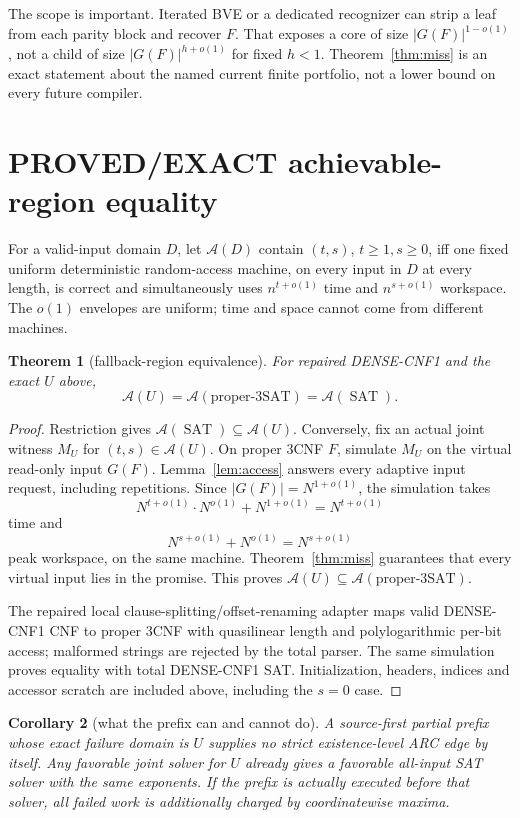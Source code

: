 \documentclass[11pt]{article}
\newtheorem{theorem}{Theorem}
\newtheorem{corollary}[theorem]{Corollary}
\newcommand{\SAT}{\operatorname{SAT}}
\newcommand{\A}{\mathcal A}
\begin{document}
The scope is important.  Iterated BVE or a dedicated recognizer can strip a
leaf from each parity block and recover $F$.  That exposes a core of size
$|G(F)|^{1-o(1)}$, not a child of size $|G(F)|^{h+o(1)}$ for fixed $h<1$.
Theorem~\ref{thm:miss} is an exact statement about the named current finite
portfolio, not a lower bound on every future compiler.

\section{PROVED/EXACT achievable-region equality}

For a valid-input domain $D$, let $\A(D)$ contain $(t,s)$, $t\ge1,s\ge0$,
iff one fixed uniform deterministic random-access machine, on every input in
$D$ at every length, is correct and simultaneously uses
$n^{t+o(1)}$ time and $n^{s+o(1)}$ workspace.  The $o(1)$ envelopes are
uniform; time and space cannot come from different machines.

\begin{theorem}[fallback-region equivalence]\label{thm:region}
For repaired DENSE-CNF1 and the exact $U$ above,
\[
 \boxed{\A(U)=\A(\mathrm{proper\mbox{-}3SAT})=\A(\SAT).}  \tag{7}
\]
\end{theorem}
\begin{proof}
Restriction gives $\A(\SAT)\subseteq\A(U)$.  Conversely, fix an actual
joint witness $M_U$ for $(t,s)\in\A(U)$.  On proper 3CNF $F$, simulate
$M_U$ on the virtual read-only input $G(F)$.  Lemma~\ref{lem:access} answers
every adaptive input request, including repetitions.  Since
$|G(F)|=N^{1+o(1)}$, the simulation takes
\[
 N^{t+o(1)}\cdot N^{o(1)}+N^{1+o(1)}=N^{t+o(1)}
\]
time and
\[
 N^{s+o(1)}+N^{o(1)}=N^{s+o(1)}
\]
peak workspace, on the same machine.  Theorem~\ref{thm:miss} guarantees that
every virtual input lies in the promise.  This proves
$\A(U)\subseteq\A(\mathrm{proper\mbox{-}3SAT})$.

The repaired local clause-splitting/offset-renaming adapter maps valid
DENSE-CNF1 CNF to proper 3CNF with quasilinear length and polylogarithmic
per-bit access; malformed strings are rejected by the total parser.  The same
simulation proves equality with total DENSE-CNF1 SAT.  Initialization,
headers, indices and accessor scratch are included above, including the
$s=0$ case.
\end{proof}

\begin{corollary}[what the prefix can and cannot do]
A source-first partial prefix whose exact failure domain is $U$ supplies no
strict existence-level ARC edge by itself.  Any favorable joint solver for
$U$ already gives a favorable all-input SAT solver with the same exponents.
If the prefix is actually executed before that solver, all failed work is
additionally charged by coordinatewise maxima.
\end{corollary}
\end{document}

